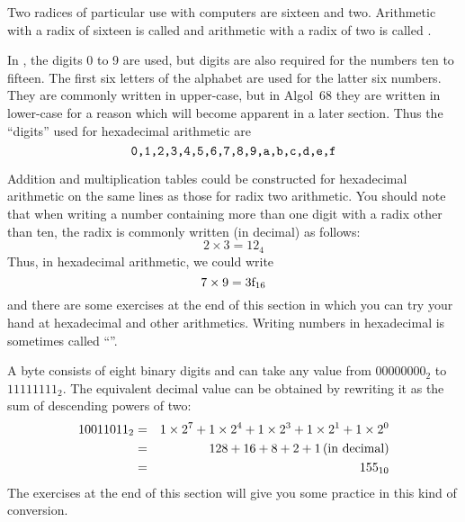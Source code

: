 Two radices of particular use with computers are sixteen and two.
Arithmetic with a radix of sixteen is called  and
arithmetic with a radix of two is called .

In , the digits 0
to 9 are used, but digits are also required for the numbers ten to
fifteen. The first six letters of the alphabet are used for the
latter six numbers. They are commonly written in upper-case, but in
Algol~68 they are written in lower-case for a reason which will
become apparent in a later section. Thus the ``digits'' used for
hexadecimal arithmetic are
$$\hbox{\verb|0,1,2,3,4,5,6,7,8,9,a,b,c,d,e,f|}$$

Addition and multiplication tables could be constructed for
hexadecimal arithmetic on the same lines as those for radix two
arithmetic. You should note that when writing a number containing
more than one digit with a radix other than ten, the radix is
commonly written (in decimal) as follows:
$$2\times3=12_4$$
Thus, in hexadecimal arithmetic, we could write
$$7\times9=3\hbox{f}_{16}$$
and there are some exercises at the end of this section in which you
can try your hand at hexadecimal and other arithmetics.  Writing
numbers in hexadecimal is sometimes called
``''.

A byte consists of eight binary digits and can take any value from
$00000000_2$ to $11111111_2$.  The equivalent decimal value can be
obtained by rewriting it as the sum of descending powers of two:
\begin{eqnarray*}
10011011_2&=&1\times2^7+1\times2^4+1\times2^3+1\times2^1+1\times2^0\\
          &=&128+16+8+2+1\,\hbox{(in decimal)}\\
          &=&155_{10}
\end{eqnarray*}
The exercises at the end of this section will give you some practice
in this kind of conversion.


